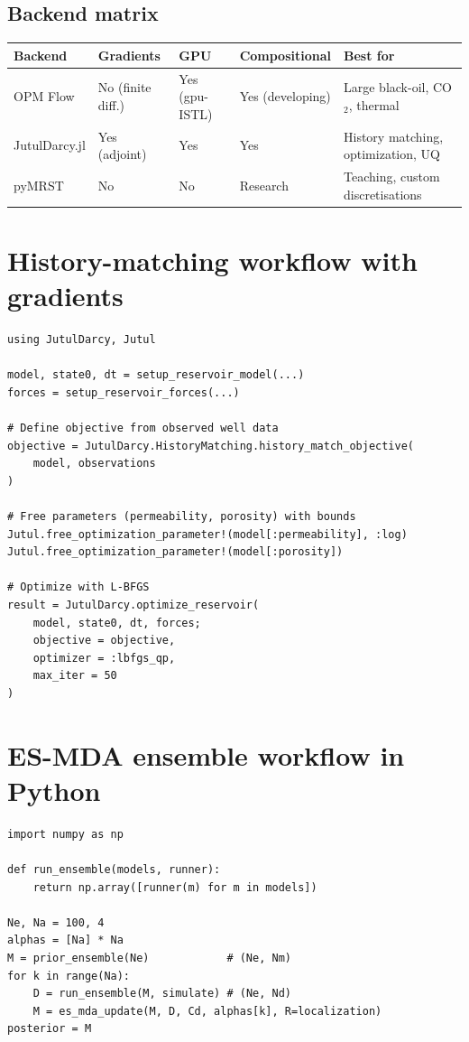 \documentclass[10pt,a4paper]{article}
\begin{document}
\subsection{Backend matrix}

\begin{longtable}{@{}p{2.8cm}p{1.8cm}p{1.8cm}p{2.2cm}p{4.0cm}@{}}
\toprule
\textbf{Backend} & \textbf{Gradients} & \textbf{GPU} & \textbf{Compositional} & \textbf{Best for}\\
\midrule
\endhead
OPM Flow & No (finite diff.) & Yes (gpu-ISTL) & Yes (developing) & Large black-oil, CO$_2$, thermal\\
JutulDarcy.jl & Yes (adjoint) & Yes & Yes & History matching, optimization, UQ\\
pyMRST & No & No & Research & Teaching, custom discretisations\\
\bottomrule
\end{longtable}

\section{History-matching workflow with gradients}

\begin{lstlisting}[style=jl, caption={Gradient-based history matching with JutulDarcy.}]
using JutulDarcy, Jutul

model, state0, dt = setup_reservoir_model(...)
forces = setup_reservoir_forces(...)

# Define objective from observed well data
objective = JutulDarcy.HistoryMatching.history_match_objective(
    model, observations
)

# Free parameters (permeability, porosity) with bounds
Jutul.free_optimization_parameter!(model[:permeability], :log)
Jutul.free_optimization_parameter!(model[:porosity])

# Optimize with L-BFGS
result = JutulDarcy.optimize_reservoir(
    model, state0, dt, forces;
    objective = objective,
    optimizer = :lbfgs_qp,
    max_iter = 50
)
\end{lstlisting}

\section{ES-MDA ensemble workflow in Python}

\begin{lstlisting}[caption={ES-MDA loop around an OPM Flow or JutulDarcy runner.}]
import numpy as np

def run_ensemble(models, runner):
    return np.array([runner(m) for m in models])

Ne, Na = 100, 4
alphas = [Na] * Na
M = prior_ensemble(Ne)            # (Ne, Nm)
for k in range(Na):
    D = run_ensemble(M, simulate) # (Ne, Nd)
    M = es_mda_update(M, D, Cd, alphas[k], R=localization)
posterior = M
\end{lstlisting}
\end{document}
